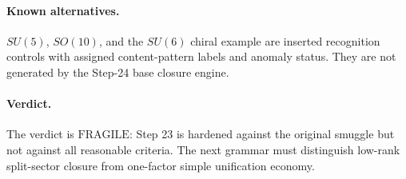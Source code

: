 \paragraph{Known alternatives.}
\(SU(5)\), \(SO(10)\), and the \(SU(6)\) chiral example are inserted recognition controls with assigned content-pattern labels and anomaly status. They are not generated by the Step-24 base closure engine.

\paragraph{Verdict.}
The verdict is \(\mathrm{FRAGILE}\): Step 23 is hardened against the original smuggle but not against all reasonable criteria. The next grammar must distinguish low-rank split-sector closure from one-factor simple unification economy.
